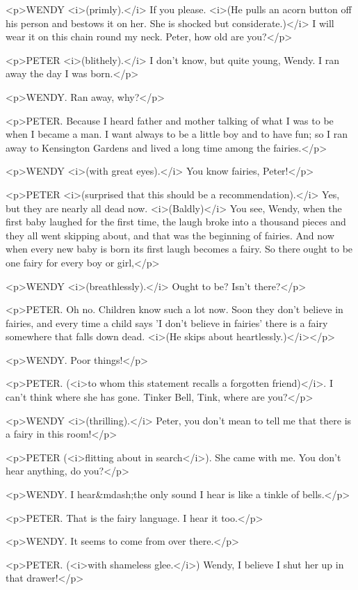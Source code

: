 <p>WENDY <i>(primly).</i> If you please. <i>(He pulls an acorn button
off his person and bestows it on her. She is shocked but
considerate.)</i> I will wear it on this chain round my neck. Peter,
how old are you?</p>

<p>PETER <i>(blithely).</i> I don't know, but quite young, Wendy. I
ran away the day I was born.</p>

<p>WENDY. Ran away, why?</p>

<p>PETER. Because I heard father and mother talking of what I was to
be when I became a man. I want always to be a little boy and to have
fun; so I ran away to Kensington Gardens and lived a long time among
the fairies.</p>

<p>WENDY <i>(with great eyes).</i> You know fairies, Peter!</p>

<p>PETER <i>(surprised that this should be a recommendation).</i>
Yes, but they are nearly all dead now. <i>(Baldly)</i> You see,
Wendy, when the first baby laughed for the first time, the laugh
broke into a thousand pieces and they all went skipping about, and
that was the beginning of fairies. And now when every new baby is
born its first laugh becomes a fairy. So there ought to be one fairy
for every boy or girl,</p>

<p>WENDY <i>(breathlessly).</i> Ought to be? Isn't there?</p>

<p>PETER. Oh no. Children know such a lot now. Soon they don't
believe in fairies, and every time a child says 'I don't believe in
fairies' there is a fairy somewhere that falls down dead. <i>(He
skips about heartlessly.)</i></p>

<p>WENDY. Poor things!</p>

<p>PETER. (<i>to whom this statement recalls a forgotten friend)</i>.
I can't think where she has gone. Tinker Bell, Tink, where are
you?</p>

<p>WENDY <i>(thrilling).</i> Peter, you don't mean to tell me that
there is a fairy in this room!</p>

<p>PETER (<i>flitting about in search</i>). She came with me. You
don't hear anything, do you?</p>

<p>WENDY. I hear&mdash;the only sound I hear is like a tinkle of
bells.</p>

<p>PETER. That is the fairy language. I hear it too.</p>

<p>WENDY. It seems to come from over there.</p>

<p>PETER. (<i>with shameless glee.</i>) Wendy, I believe I shut her
up in that drawer!</p>

